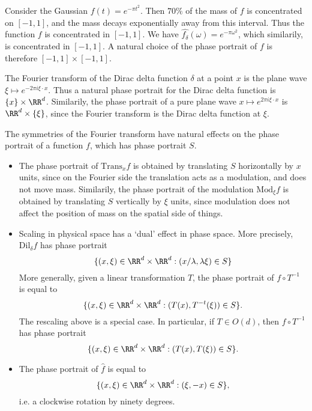 \begin{example}
  Consider the Gaussian $f(t) = e^{- \pi t^2}$. Then $70\%$ of the mass of $f$ is concentrated on $[-1,1]$, and the mass decays exponentially away from this interval. Thus the function $f$ is concentrated in $[-1,1]$. We have $\widehat{f_\delta}(\omega) = e^{- \pi \omega^2}$, which similarily, is concentrated in $[-1,1]$. A natural choice of the phase portrait of $f$ is therefore $[-1,1] \times [-1,1]$.
\end{example}

\begin{example}
  The Fourier transform of the Dirac delta function $\delta$ at a point $x$ is the plane wave $\xi \mapsto e^{- 2 \pi i \xi \cdot x}$. Thus a natural phase portrait for the Dirac delta function is $\{ x \} \times \RR^d$. Similarily, the phase portrait of a pure plane wave $x \mapsto e^{2 \pi i \xi \cdot x}$ is $\RR^d \times \{ \xi \}$, since the Fourier transform is the Dirac delta function at $\xi$.
\end{example}

The symmetries of the Fourier transform have natural effects on the phase portrait of a function $f$, which has phase portrait $S$.

\begin{itemize}
  \item The phase portrait of $\text{Trans}_x f$ is obtained by translating $S$ horizontally by $x$ units, since on the Fourier side the translation acts as a modulation, and does not move mass. Similarily, the phase portrait of the modulation $\text{Mod}_\xi f$ is obtained by translating $S$ vertically by $\xi$ units, since modulation does not affect the position of mass on the spatial side of things.

  \item Scaling in physical space has a `dual' effect in phase space. More precisely, $\text{Dil}_\delta f$ has phase portrait
  \[ \{ (x,\xi) \in \RR^d \times \RR^d: (x/\lambda, \lambda \xi) \in S \} \]
  More generally, given a linear transformation $T$, the phase portrait of $f \circ T^{-1}$ is equal to
  \[ \{ (x,\xi) \in \RR^d \times \RR^d: (T(x), T^{-t}(\xi)) \in S \}. \]
  The rescaling above is a special case. In particular, if $T \in O(d)$, then $f \circ T^{-1}$ has phase portrait
  \[ \{ (x,\xi) \in \RR^d \times \RR^d: (T(x), T(\xi)) \in S \}. \]

  \item The phase portrait of $\widehat{f}$ is equal to
  \[ \{ (x,\xi) \in \RR^d \times \RR^d: (\xi,-x) \in S \}, \]
  i.e. a clockwise rotation by ninety degrees.
\end{itemize}

